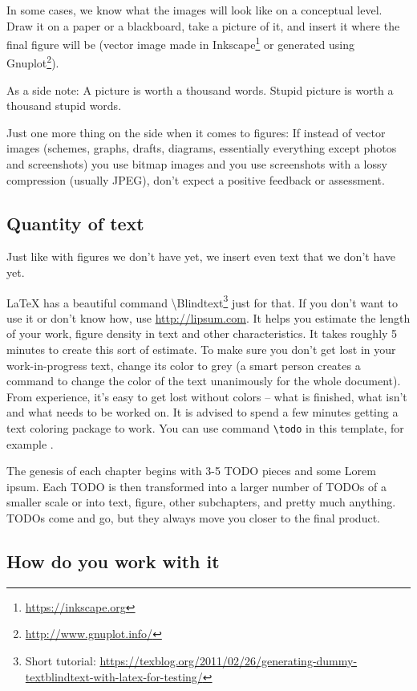 In some cases, we know what the images will look like on a conceptual level. Draw it on a paper or a blackboard, take a picture of it, and insert it where the final figure will be (vector image made in Inkscape\footnote{\url{https://inkscape.org}} or generated using Gnuplot\footnote{\url{http://www.gnuplot.info/}}). 

As a side note: A picture is worth a thousand words. Stupid picture is worth a thousand stupid words.

Just one more thing on the side when it comes to figures: If instead of vector images (schemes, graphs, drafts, diagrams, essentially everything except photos and screenshots) you use bitmap images and you use screenshots with a lossy compression (usually JPEG), don't expect a positive feedback or assessment.

\subsection{Quantity of text}

Just like with figures we don't have yet, we insert even text that we don't have yet.

LaTeX has a beautiful command \textbackslash Blindtext\footnote{Short tutorial: \url{https://texblog.org/2011/02/26/generating-dummy-textblindtext-with-latex-for-testing/}} just for that. If you don't want to use it or don't know how, use \url{http://lipsum.com}. It helps you estimate the length of your work, figure density in text and other characteristics. It takes roughly 5 minutes to create this sort of estimate. To make sure you don't get lost in your work-in-progress text, change its color to grey (a smart person creates a command to change the color of the text unanimously for the whole document). From experience, it's easy to get lost without colors -- what is finished, what isn't and what needs to be worked on. It is advised to spend a few minutes getting a text coloring package to work. You can use command \verb|\todo| in this template, for example .

The genesis of each chapter begins with 3-5 TODO pieces and some Lorem ipsum. Each TODO is then transformed into a larger number of TODOs of a smaller scale or into text, figure, other subchapters, and pretty much anything. TODOs come and go, but they always move you closer to the final product.

\subsection{How do you work with it}

